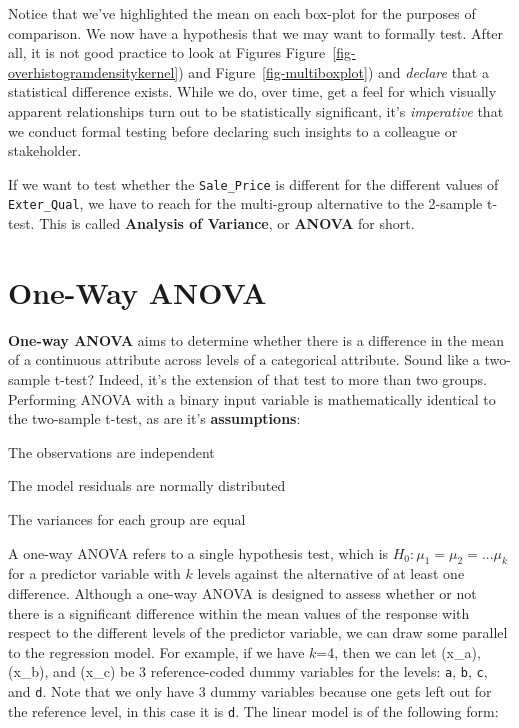 \documentclass[
  letterpaper,
  DIV=11,
  numbers=noendperiod]{scrreprt}
\begin{document}
Notice that we've highlighted the mean on each box-plot for the purposes
of comparison. We now have a hypothesis that we may want to formally
test. After all, it is not good practice to look at Figures
Figure~\ref{fig-overhistogramdensitykernel}) and
Figure~\ref{fig-multiboxplot}) and \emph{declare} that a statistical
difference exists. While we do, over time, get a feel for which visually
apparent relationships turn out to be statistically significant, it's
\emph{imperative} that we conduct formal testing before declaring such
insights to a colleague or stakeholder.

If we want to test whether the \texttt{Sale\_Price} is different for the
different values of \texttt{Exter\_Qual}, we have to reach for the
multi-group alternative to the 2-sample t-test. This is called
\textbf{Analysis of Variance}, or \textbf{ANOVA} for short.

\hypertarget{sec-oneway}{%
\section{One-Way ANOVA}\label{sec-oneway}}

\textbf{One-way ANOVA} aims to determine whether there is a difference
in the mean of a continuous attribute across levels of a categorical
attribute. Sound like a two-sample t-test? Indeed, it's the extension of
that test to more than two groups. Performing ANOVA with a binary input
variable is mathematically identical to the two-sample t-test, as are
it's \textbf{assumptions}:

The observations are independent

The model residuals are normally distributed

The variances for each group are equal

A one-way ANOVA refers to a single hypothesis test, which is
\(H_{0}: \mu_{1}=\mu_{2}=...\mu_{k}\) for a predictor variable with
\(k\) levels against the alternative of at least one difference.
Although a one-way ANOVA is designed to assess whether or not there is a
significant difference within the mean values of the response with
respect to the different levels of the predictor variable, we can draw
some parallel to the regression model. For example, if we have \(k\)=4,
then we can let (x\_a), (x\_b), and (x\_c) be 3 reference-coded dummy
variables for the levels: \texttt{a}, \texttt{b}, \texttt{c}, and
\texttt{d}. Note that we only have 3 dummy variables because one gets
left out for the reference level, in this case it is \texttt{d}. The
linear model is of the following form:
\end{document}
